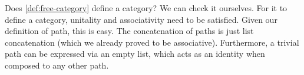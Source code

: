 {Does \cref{def:free-category} define a category?
We can check it ourselves.
For it to define a category, unitality and associativity need to be satisfied.
Given our definition of path, this is easy.
The concatenation of paths is just list concatenation (which we already proved to be associative).
Furthermore, a trivial path can be expressed via an empty list, which acts as an identity when composed to any other path.
%
%

}
